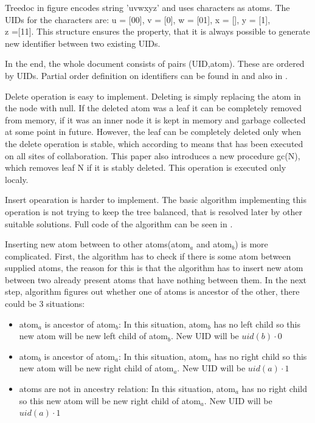 \documentclass[12pt,oneside]{fithesis2}
\begin{document}
\par Treedoc in figure encodes string 'uvwxyz' and uses characters as atoms. The UIDs for the characters are: u = [00], v = [0], w = [01], x = [], y = [1],\\z =[11]. This structure ensures the property, that it is always possible to generate new identifier between two existing UIDs. 
\par In the end, the whole document consists of pairs (UID,atom). These are ordered by UIDs. Partial order definition on identifiers can be found in \cite{Shapiro-design} and also in \cite{Shapiro-editing}. 
\par Delete operation is easy to implement. Deleting is simply replacing the atom in the node with null. If the deleted atom was a leaf it can be completely removed from memory, if it was an inner node it is kept in memory and garbage collected at some point in future. However, the leaf can be completely deleted only when the delete operation is stable, which according to \cite{Shapiro-design} means that has been executed on all sites of collaboration. This paper also introduces a new procedure gc(N), which removes leaf N if it is stably deleted. This operation is executed only localy.
\par Insert opearation is harder to implement. The basic algorithm implementing this operation is not trying to keep the tree balanced, that is resolved later by other suitable solutions. Full code of the algorithm can be seen in \cite{Shapiro-design} \cite{Shapiro-editing}. 
\par Inserting new atom between to other atoms(atom\(_a\) and atom\(_b\)) is more complicated. First, the algorithm has to check if there is some atom between supplied atoms, the reason for this is that the algorithm has to insert new atom between two already present atoms that have nothing between them.
In the next step, algorithm figures out whether one of atoms is ancestor of the other, there could be 3 situations:
\begin{itemize}
\item atom\(_a\) is ancestor of atom\(_b\): In this situation, atom\(_b\) has no left child so this new atom will be new left child of atom\(_b\). New UID will be \(uid(b) \cdot 0\)
\item atom\(_b\) is ancestor of atom\(_a\): In this situation, atom\(_a\) has no right child so this new atom will be new right child of atom\(_a\). New UID will be \(uid(a) \cdot 1\)
\item atoms are not in ancestry relation:  In this situation, atom\(_a\) has no right child so this new atom will be new right child of atom\(_a\). New UID will be \(uid(a) \cdot 1\)
\end{itemize}
\end{document}
